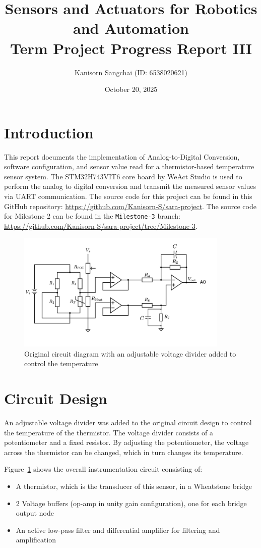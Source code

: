 \documentclass[12pt,a4paper]{article}
\title{Sensors and Actuators for Robotics and
Automation\\Term Project Progress Report III}
\author{Kanisorn Sangchai (ID: 6538020621)}
\date{October 20, 2025}
\begin{document}
\maketitle

\section{Introduction}
This report documents the implementation of Analog-to-Digital Conversion, software configuration, and sensor value read for a thermistor-based temperature sensor system. The STM32H743VIT6 core board by WeAct Studio is used to perform the analog to digital conversion and transmit the measured sensor values via UART communication. The source code for this project can be found in this GitHub repository: \url{https://github.com/Kanisorn-S/sara-project}. The source code for Milestone 2 can be found in the \texttt{Milestone-3} branch: \url{https://github.com/Kanisorn-S/sara-project/tree/Milestone-3}.

\begin{figure}[h]
    \centering
    \includegraphics[width=0.9\textwidth]{images/circuit_diagram.png}
    \caption{Original circuit diagram with an adjustable voltage divider added to control the temperature}
    \label{fig:circuit}
\end{figure}

\section{Circuit Design}
An adjustable voltage divider was added to the original circuit design to control the temperature of the thermistor. The voltage divider consists of a potentiometer and a fixed resistor. By adjusting the potentiometer, the voltage across the thermistor can be changed, which in turn changes its temperature.

Figure~\ref{fig:circuit} shows the overall instrumentation circuit consisting of:
\begin{itemize}
    \item A thermistor, which is the transducer of this sensor, in a Wheatstone bridge
    \item 2 Voltage buffers (op-amp in unity gain configuration), one for each bridge output node
    \item An active low-pass filter and differential amplifier for filtering and amplification
\end{itemize}
\end{document}
